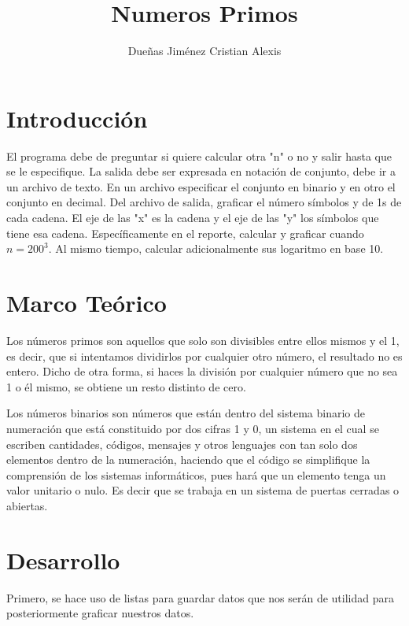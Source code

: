 \documentclass{article}
\title{Numeros Primos}
\author{Dueñas Jiménez Cristian Alexis}
\begin{document}
\maketitle

\section{Introducción}
El programa debe de preguntar si quiere calcular otra "n" o no y salir hasta que se le especifique. La salida debe ser expresada en notación de conjunto, debe ir a un archivo de texto. En un archivo especificar el conjunto en binario y en otro el conjunto en decimal. Del archivo de salida, graficar el número símbolos y de 1s de cada cadena. El eje de las "x" es la cadena y el eje de las "y" los símbolos que tiene esa cadena. Específicamente en el reporte, calcular y graficar cuando $n=200^3$. Al mismo tiempo, calcular adicionalmente sus logaritmo en base 10.


\section{Marco Teórico}
Los números primos son aquellos que solo son divisibles entre ellos mismos y el 1, es decir, que si intentamos dividirlos por cualquier otro número, el resultado no es entero. Dicho de otra forma, si haces la división por cualquier número que no sea 1 o él mismo, se obtiene un resto distinto de cero.

Los números binarios son números que están dentro del sistema binario de numeración que está constituido por dos cifras 1 y 0, un sistema en el cual se escriben cantidades, códigos, mensajes y otros lenguajes con tan solo dos elementos dentro de la numeración, haciendo que el código se simplifique la comprensión de los sistemas informáticos, pues hará que un elemento tenga un valor unitario o nulo. Es decir que se trabaja en un sistema de puertas cerradas o abiertas.
\section{Desarrollo}


Primero, se hace uso de listas para guardar datos que nos serán de utilidad para posteriormente graficar nuestros datos.
\end{document}

